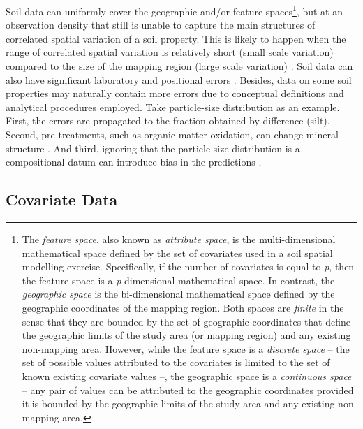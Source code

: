 \def\footfeature{\footnote{The \emph{feature space}, also known as \emph{attribute space}, is the 
multi-dimensional mathematical space defined by the set of covariates used in a soil spatial modelling 
exercise. Specifically, if the number of covariates is equal to \textit{p}, then the feature space is a 
\textit{p}-dimensional mathematical space. In contrast, the \emph{geographic space} is the bi-dimensional 
mathematical space defined by the geographic coordinates of the mapping region. Both spaces are \emph{finite} 
in the sense that they are bounded by the set of geographic coordinates that define the geographic limits of 
the study area (or mapping region) and any existing non-mapping area. However, while the feature space is a 
\emph{discrete space} -- the set of possible values attributed to the covariates is limited to the set of 
known existing covariate values --, the geographic space is a \emph{continuous space} -- any pair of values 
can be attributed to the geographic coordinates provided it is bounded by the geographic limits of the study 
area and any existing non-mapping area.}}

Soil data can uniformly cover the geographic and/or feature spaces\footfeature{}, but at an observation 
density that still is unable to capture the main structures of correlated spatial variation of a soil property.
This is likely to happen when the range of correlated spatial variation is relatively short (small scale 
variation) compared to the size of the mapping region (large scale variation) \cite{Burrough1983}. Soil data 
can also have significant laboratory and positional errors \cite{NelsonEtAl2011}. Besides, data on some soil 
properties may naturally contain more errors due to conceptual definitions and analytical procedures employed. 
Take particle-size distribution as an example. First, the errors are propagated to the fraction obtained by 
difference (silt). Second, pre-treatments, such as organic matter oxidation, can change mineral structure 
\cite{MikuttaEtAl2005a}. And third, ignoring that the particle-size distribution is a compositional datum can 
introduce bias in the predictions \cite{LarkEtAl2007}.

\subsection{Covariate Data}
\label{sec:chap02-covar-data}


